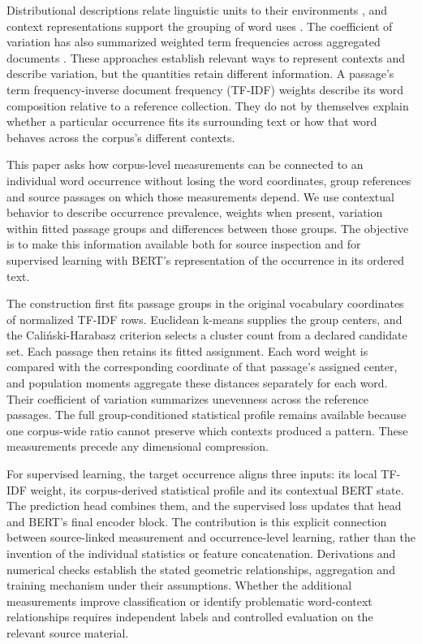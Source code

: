 \documentclass[10pt,letterpaper]{article}
\begin{document}
Distributional descriptions relate linguistic units to their environments \cite{harris}, and context representations support the grouping of word uses \cite{schutze98}. The coefficient of variation has also summarized weighted term frequencies across aggregated documents \cite{bosecv}. These approaches establish relevant ways to represent contexts and describe variation, but the quantities retain different information. A passage's term frequency-inverse document frequency (TF-IDF) weights describe its word composition relative to a reference collection. They do not by themselves explain whether a particular occurrence fits its surrounding text or how that word behaves across the corpus's different contexts.\par

This paper asks how corpus-level measurements can be connected to an individual word occurrence without losing the word coordinates, group references and source passages on which those measurements depend. We use contextual behavior to describe occurrence prevalence, weights when present, variation within fitted passage groups and differences between those groups. The objective is to make this information available both for source inspection and for supervised learning with BERT's representation of the occurrence in its ordered text.\par

The construction first fits passage groups in the original vocabulary coordinates of normalized TF-IDF rows. Euclidean k-means supplies the group centers, and the Caliński-Harabasz criterion selects a cluster count from a declared candidate set. Each passage then retains its fitted assignment. Each word weight is compared with the corresponding coordinate of that passage's assigned center, and population moments aggregate these distances separately for each word. Their coefficient of variation summarizes unevenness across the reference passages. The full group-conditioned statistical profile remains available because one corpus-wide ratio cannot preserve which contexts produced a pattern. These measurements precede any dimensional compression.\par

For supervised learning, the target occurrence aligns three inputs: its local TF-IDF weight, its corpus-derived statistical profile and its contextual BERT state. The prediction head combines them, and the supervised loss updates that head and BERT's final encoder block. The contribution is this explicit connection between source-linked measurement and occurrence-level learning, rather than the invention of the individual statistics or feature concatenation. Derivations and numerical checks establish the stated geometric relationships, aggregation and training mechanism under their assumptions. Whether the additional measurements improve classification or identify problematic word-context relationships requires independent labels and controlled evaluation on the relevant source material.\par
\end{document}
